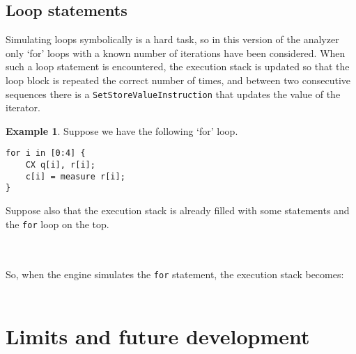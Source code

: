 \documentclass[12pt,a4paper]{report}
\theoremstyle{definition}
\theoremstyle{definition}
\newtheorem{example}{Example}[section]
\theoremstyle{definition}
\begin{document}
\subsection{Loop statements}
Simulating loops symbolically is a hard task, so in this version of the analyzer only `for' loops with a known number of iterations have been considered. When such a loop statement is encountered, the execution stack is updated so that the loop block is repeated the correct number of times, and between two consecutive sequences there is a \texttt{SetStoreValueInstruction} that updates the value of the iterator.
\begin{example}
Suppose we have the following `for' loop.
\begin{lstlisting}
for i in [0:4] {
    CX q[i], r[i];
    c[i] = measure r[i];
}
\end{lstlisting}
Suppose also that the execution stack is already filled with some statements and the \texttt{for} loop on the top.\\
\\
\\
So, when the engine simulates the \texttt{for} statement, the execution stack becomes:\\
\\
\end{example}
\section{Limits and future development}


\printbibliography
\end{document}
